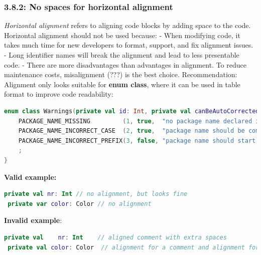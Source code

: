 \subsubsection*{\textbf{3.8.2: No spaces for horizontal alignment}}
\leavevmode\newline
\label{sec:3.8.2}
\textit{Horizontal alignment} refers to aligning code blocks by adding space to the code. Horizontal alignment should not be used because:
- When modifying code, it takes much time for new developers to format, support, and fix alignment issues.
- Long identifier names will break the alignment and lead to less presentable code.
- There are more disadvantages than advantages in alignment. To reduce maintenance costs, misalignment (???) is the best choice.
Recommendation: Alignment only looks suitable for \textbf{enum class}, where it can be used in table format to improve code readability:
\begin{lstlisting}[language=Kotlin]
enum class Warnings(private val id: Int, private val canBeAutoCorrected: Boolean, private val warn: String) : Rule {
    PACKAGE_NAME_MISSING         (1, true,  "no package name declared in a file"),
    PACKAGE_NAME_INCORRECT_CASE  (2, true,  "package name should be completely in a lower case"),
    PACKAGE_NAME_INCORRECT_PREFIX(3, false, "package name should start from the company's domain")
    ;
}
\end{lstlisting}
\textbf{Valid example:}
\begin{lstlisting}[language=Kotlin]
 private val nr: Int // no alignment, but looks fine
 private var color: Color // no alignment
\end{lstlisting}
\textbf{Invalid example}:
\begin{lstlisting}[language=Kotlin]
 private val    nr: Int    // aligned comment with extra spaces
 private val color: Color  // alignment for a comment and alignment for identifier name
\end{lstlisting}
